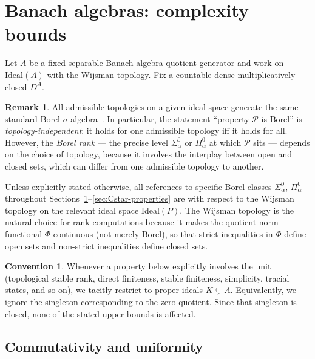 \documentclass[12pt,fleqn,a4paper]{amsart}
\numberwithin{equation}{section}
\theoremstyle{definition}
\newtheorem{remark}[theorem]{Remark}
\newtheorem{convention}[theorem]{Convention}
\newcommand{\Ideal}{\mathrm{Ideal}}
\begin{document}
\section{Banach algebras: complexity bounds}\label{sec:banach-complexity}

Let $A$ be a fixed separable Banach-algebra quotient generator and work on
$\Ideal(A)$ with the Wijsman topology.
Fix a countable dense multiplicatively closed $D^A$.

\begin{remark}\label{rem:rank-convention}
All admissible topologies on a given ideal space generate the same standard Borel
$\sigma$-algebra~\cite{GodefroySaintRaymond2018}.  In particular, the statement
``property $\mathcal P$ is Borel'' is \emph{topology-independent}: it holds for
one admissible topology iff it holds for all.
However, the \emph{Borel rank} --- the precise level $\Sigma^0_\alpha$ or
$\Pi^0_\alpha$ at which $\mathcal P$ sits --- depends on the choice of topology,
because it involves the interplay between open and closed sets, which can differ
from one admissible topology to another.

Unless explicitly stated otherwise, all references to specific Borel classes
$\Sigma^0_\alpha$, $\Pi^0_\alpha$ throughout
Sections~\ref{sec:banach-complexity}--\ref{sec:Cstar-properties} are with respect to
the Wijsman topology on the relevant ideal space $\Ideal(P)$.  The Wijsman topology
is the natural choice for rank computations because it makes the quotient-norm
functional $\Phi$ continuous (not merely Borel), so that strict inequalities in
$\Phi$ define open sets and non-strict inequalities define closed sets.
\end{remark}

\begin{convention}\label{conv:proper-quotients}
Whenever a property below explicitly involves the unit
(topological stable rank, direct finiteness, stable finiteness, simplicity, tracial
states, and so on), we tacitly restrict to proper ideals $K\subsetneq A$.
Equivalently, we ignore the singleton corresponding to the zero quotient.
Since that singleton is closed, none of the stated upper bounds is affected.
\end{convention}

\subsection{Commutativity and uniformity}
\end{document}

